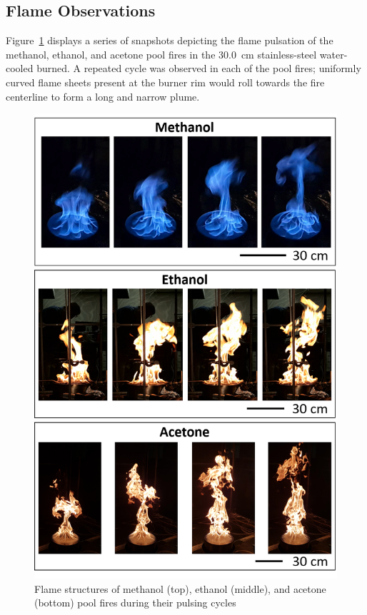 \documentclass[12pt]{article}
\begin{document}
\subsection{Flame Observations}
\label{ssec:Flame_Observations}

Figure~\ref{fig:Flame_Structure} displays a series of snapshots depicting the flame pulsation of the methanol, ethanol, and acetone pool fires in the 30.0~\si{cm} stainless-steel water-cooled burned. A repeated cycle was observed in each of the pool fires; uniformly curved flame sheets present at the burner rim would roll towards the fire centerline to form a long and narrow plume.
\begin{figure}[!]
	\centering
\includegraphics[width=12.0cm,keepaspectratio]{Flame_Structure.png}
	\caption[Pool Fire Structures]{Flame structures of methanol (top), ethanol (middle), and acetone (bottom) pool fires during their pulsing cycles}
	\label{fig:Flame_Structure}
\end{figure}
\end{document}
